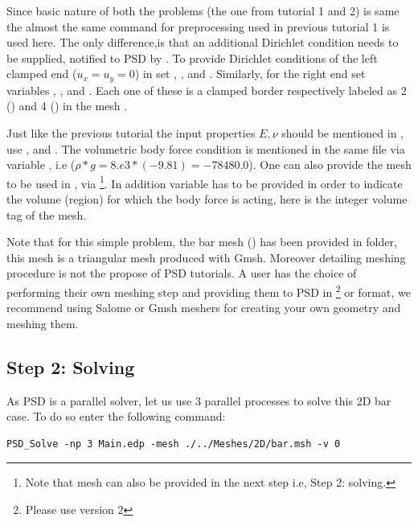 Since basic nature of both the problems (the one from tutorial 1 and 2)
is same the almost the same command for preprocessing used in previous
tutorial 1 is used here. The only difference,is that an additional
Dirichlet condition needs to be supplied, notified to PSD by
. To provide Dirichlet conditions of the
left clamped end (\(u_x=u_y=0\)) in  set
, , and . Similarly, for the
right end set variables , , and
. Each one of these is a clamped border respectively
labeled as 2 () and 4 () in the mesh
.

Just like the previous tutorial the input properties \(E,\nu\) should be
mentioned in , use , and
. The volumetric body force condition is mentioned in the
same file via variable , i.e
(\(\rho*g=8.e3*(-9.81)=-78480.0\)). One can also provide the mesh to be
used in  , via
\footnote{Note that mesh can also be provided in the next step i.e, Step 2: solving.}.
In addition variable  has to be provided in order to
indicate the volume (region) for which the body force is acting, here
 is the integer volume tag of the mesh.

Note that for this simple problem, the bar mesh () has been
provided in  folder, this mesh is a triangular mesh
produced with Gmsh. Moreover detailing meshing procedure is not the
propose of PSD tutorials. A user has the choice of performing their own
meshing step and providing them to PSD in
\footnote{Please use version 2} or  format, we
recommend using Salome or Gmsh meshers for creating your own geometry
and meshing them.

\subsection{Step 2: Solving}

As PSD is a parallel solver, let us use 3 parallel processes to solve
this 2D bar case. To do so enter the following command:

\begin{lstlisting}[style=BashInputStyle]
PSD_Solve -np 3 Main.edp -mesh ./../Meshes/2D/bar.msh -v 0
\end{lstlisting}

